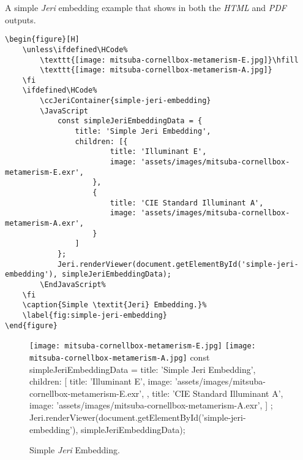 A simple \textit{Jeri} embedding example that shows in both the \textit{HTML} and \textit{PDF} outputs.

\begin{lstlisting}[caption={Simple \textit{Jeri} Embedding.}]
\begin{figure}[H]
    \unless\ifdefined\HCode%
        \texttt{[image: mitsuba-cornellbox-metamerism-E.jpg]}\hfill
        \texttt{[image: mitsuba-cornellbox-metamerism-A.jpg]}
    \fi
    \ifdefined\HCode%
        \ccJeriContainer{simple-jeri-embedding}
        \JavaScript
            const simpleJeriEmbeddingData = {
                title: 'Simple Jeri Embedding',
                children: [{
                        title: 'Illuminant E',
                        image: 'assets/images/mitsuba-cornellbox-metamerism-E.exr',
                    },
                    {
                        title: 'CIE Standard Illuminant A',
                        image: 'assets/images/mitsuba-cornellbox-metamerism-A.exr',
                    }
                ]
            };
            Jeri.renderViewer(document.getElementById('simple-jeri-embedding'), simpleJeriEmbeddingData);
        \EndJavaScript%
    \fi
    \caption{Simple \textit{Jeri} Embedding.}%
    \label{fig:simple-jeri-embedding}
\end{figure}
\end{lstlisting}

\begin{figure}[H]
    \unless\ifdefined\HCode%
        \texttt{[image: mitsuba-cornellbox-metamerism-E.jpg]}\hfill
        \texttt{[image: mitsuba-cornellbox-metamerism-A.jpg]}
    \fi
    \ifdefined\HCode%
        \JavaScript
            const simpleJeriEmbeddingData = {
                title: 'Simple Jeri Embedding',
                children: [{
                        title: 'Illuminant E',
                        image: 'assets/images/mitsuba-cornellbox-metamerism-E.exr',
                    },
                    {
                        title: 'CIE Standard Illuminant A',
                        image: 'assets/images/mitsuba-cornellbox-metamerism-A.exr',
                    }
                ]
            };
            Jeri.renderViewer(document.getElementById('simple-jeri-embedding'), simpleJeriEmbeddingData);
        \EndJavaScript%
    \fi
    \caption{Simple \textit{Jeri} Embedding.}%
    \label{fig:simple-jeri-embedding}
\end{figure}

